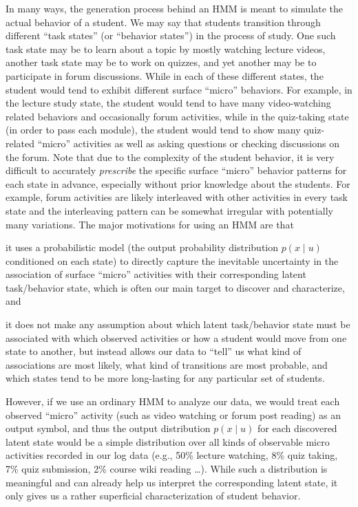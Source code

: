 In many ways, the generation process behind an HMM is meant to simulate the
actual behavior of a student. We may say that students transition through
different ``task states'' (or ``behavior states'')  in the process of
study.  One such task state may be to learn about a topic by mostly
watching lecture videos, another task state may be to work on quizzes, and
yet another may be to participate in forum discussions. While in each of
these different states, the student would tend to exhibit different surface
``micro'' behaviors. For example, in the lecture study state, the student
would tend to have many video-watching related behaviors and occasionally
forum activities, while in the quiz-taking state (in order to pass each
module), the student would tend to show many quiz-related ``micro''
activities as well as asking questions or checking discussions on the
forum. Note that due to the complexity of the student behavior, it is very
difficult to accurately \emph{prescribe} the specific surface ``micro''
behavior patterns for each state in advance, especially without  prior
knowledge about the students. For example, forum activities are likely
interleaved with other activities   in every task state and the
interleaving pattern can be somewhat irregular with potentially many
variations.  The major motivations for using an HMM are that
\begin{enumerate*}[label=(\arabic*)]
  \item it uses a probabilistic model (the output probability distribution
    $p(x \mid u)$ conditioned on each state) to directly capture the
    inevitable uncertainty in the association of surface ``micro''
    activities with their corresponding latent task/behavior state, which
    is often our main target to discover and characterize, and
  \item it does not make any assumption about which latent task/behavior
    state must be associated with which observed activities or how a
    student would move from one state to another, but instead allows our
    data to ``tell'' us what kind of associations are most likely, what
    kind of transitions are most probable, and which states tend to be more
    long-lasting for any particular set of students.
\end{enumerate*}

However, if we use an ordinary HMM to analyze our data, we would treat each
observed ``micro'' activity (such as video watching or forum post reading)
as an output symbol, and thus the output distribution $p(x \mid u)$ for each
discovered latent state would be a simple distribution over all kinds of
observable micro activities recorded in our log data (e.g., 50\% lecture
watching, 8\% quiz taking, 7\% quiz submission, 2\% course wiki reading
\ldots). While such a distribution is meaningful and can already help us
interpret the corresponding latent state, it only gives us a rather
superficial characterization of student behavior.

